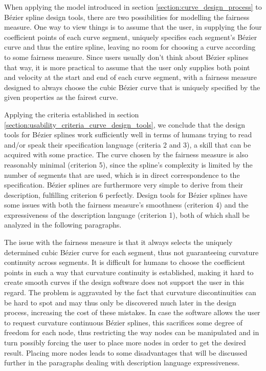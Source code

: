 \documentclass[a4paper]{article}
\begin{document}
				When applying the model introduced in section \ref{section:curve_design_process} to Bézier spline design tools, there are two possibilities for modelling the fairness measure. One way to view things is to assume that the user, in supplying the four coefficient points of each curve segment, uniquely specifies each segment's Bézier curve and thus the entire spline, leaving no room for choosing a curve according to some fairness measure. Since users usually don't think about Bézier splines that way, it is more practical to assume that the user only supplies both point and velocity at the start and end of each curve segment, with a fairness measure designed to always choose the cubic Bézier curve that is uniquely specified by the given properties as the fairest curve.

				Applying the criteria established in section \ref{section:usability_criteria_curve_design_tools}, we conclude that the design tools for Bézier splines work sufficiently well in terms of humans trying to read and/or speak their specification language (criteria 2 and 3), a skill that can be acquired with some practice. The curve chosen by the fairness measure is also reasonably minimal (criterion 5), since the spline's complexity is limited by the number of segments that are used, which is in direct correspondence to the specification. Bézier splines are furthermore very simple to derive from their description, fulfilling criterion 6 perfectly. Design tools for Bézier splines have some issues with both the fairness measure's smoothness (criterion 4) and the expressiveness of the description language (criterion 1), both of which shall be analyzed in the following paragraphs.

				The issue with the fairness measure is that it always selects the uniquely determined cubic Bézier curve for each segment, thus not guaranteeing curvature continuity across segments. It is difficult for humans to choose the coefficient points in such a way that curvature continuity is established, making it hard to create smooth curves if the design software does not support the user in this regard. The problem is aggravated by the fact that curvature discontinuities can be hard to spot and may thus only be discovered much later in the design process, increasing the cost of these mistakes. In case the software allows the user to request curvature continuous Bézier splines, this sacrifices some degree of freedom for each node, thus restricting the way nodes can be manipulated and in turn possibly forcing the user to place more nodes in order to get the desired result. Placing more nodes leads to some disadvantages that will be discussed further in the paragraphs dealing with description language expressiveness.
\end{document}
